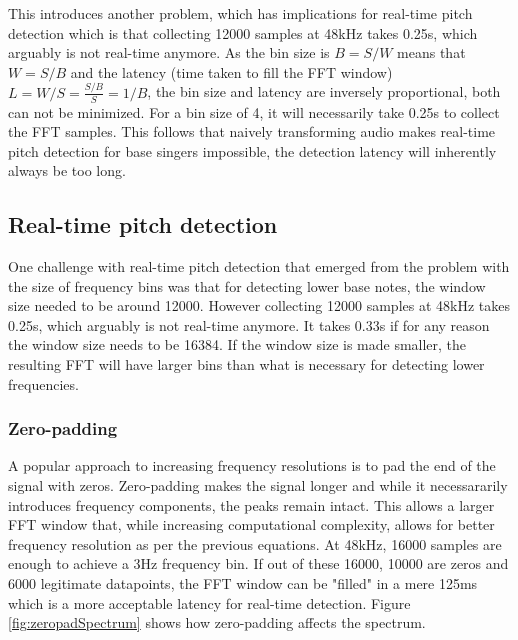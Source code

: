 This introduces another problem, which has implications for real-time pitch detection which is that collecting 12000 samples at 48kHz takes 0.25s, which arguably is not real-time anymore. As the bin size is $B = S/W$ means that $W = S/B$ and the latency (time taken to fill the FFT window) $L = W/S = \frac{S/B}{S} = 1/B$, the bin size and latency are inversely proportional, both can not be minimized. For a bin size of 4, it will necessarily take 0.25s to collect the FFT samples. This follows that naively transforming audio makes real-time pitch detection for base singers impossible, the detection latency will inherently always be too long.

\subsection{Real-time pitch detection}
One challenge with real-time pitch detection that emerged from the problem with the size of frequency bins was that for detecting lower base notes, the window size needed to be around 12000. However collecting 12000 samples at 48kHz takes 0.25s, which arguably is not real-time anymore. It takes 0.33s if for any reason the window size needs to be 16384. If the window size is made smaller, the resulting FFT will have larger bins than what is necessary for detecting lower frequencies. 
\subsubsection{Zero-padding}
A popular approach to increasing frequency resolutions is to pad the end of the signal with zeros. Zero-padding makes the signal longer and while it necessararily introduces frequency components, the peaks remain intact. This allows a larger FFT window that, while increasing computational complexity, allows for better frequency resolution as per the previous equations. At 48kHz, 16000 samples are enough to achieve a 3Hz frequency bin. If out of these 16000, 10000 are zeros and 6000 legitimate datapoints, the FFT window can be "filled" in a mere 125ms which is a more acceptable latency for real-time detection. Figure \ref{fig:zeropadSpectrum} shows how zero-padding affects the spectrum.

